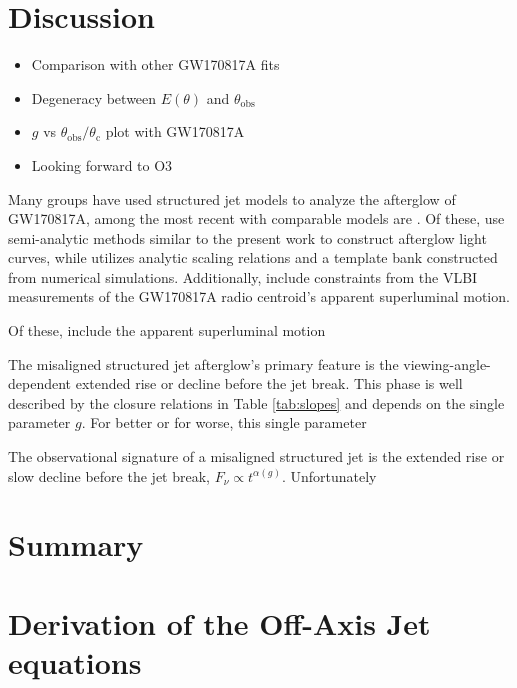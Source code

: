 \documentclass[twocolumn]{aastex62}
\newcommand{\gwbns}{GW170817A}
\newcommand{\thobs}{\ensuremath{\theta_{\mathrm{obs}}}}
\newcommand{\thC}{\ensuremath{\theta_{\mathrm{c}}}}
\begin{document}
\section{Discussion}

\begin{itemize}
	\item Comparison with other \gwbns{} fits
	\item Degeneracy between $E(\theta)$ and $\thobs$
	\item $g$ vs $\thobs / \thC$ plot with \gwbns{}
	\item Looking forward to O3
\end{itemize}

Many groups have used structured jet models to analyze the afterglow of \gwbns{}, among the most recent with comparable models are \citet{Hotokezaka:2018aa, Ghirlanda:2019aa, Lamb:2019aa, Wu:2018aa}.  Of these, \citet{Hotokezaka:2018aa, Ghirlanda:2019aa, Lamb:2019aa} use semi-analytic methods similar to the present work to construct afterglow light curves, while \citet{Wu:2018aa} utilizes analytic scaling relations and a template bank constructed from numerical simulations.  Additionally, \citet{Hotokezaka:2018aa, Ghirlanda:2019aa} include constraints from the VLBI measurements of the \gwbns{} radio centroid's apparent superluminal motion.

Of these, \citet{Mooley:2018ab, Hotokezaka:2018aa, Ghirlanda:2019aa} include the apparent superluminal motion


The misaligned structured jet afterglow's primary feature is the viewing-angle-dependent extended rise or decline before the jet break.  This phase is well described by the closure relations in Table \ref{tab:slopes} and depends on the single parameter $g$.  For better or for worse, this single parameter 


The observational signature of a misaligned structured jet is the extended rise or slow decline before the jet break, $F_\nu \propto t^{\alpha(g)}$.  Unfortunately


\section{Summary}




\newpage


\appendix
\section{Derivation of the Off-Axis Jet equations}\label{sec:derive1}
\end{document}

